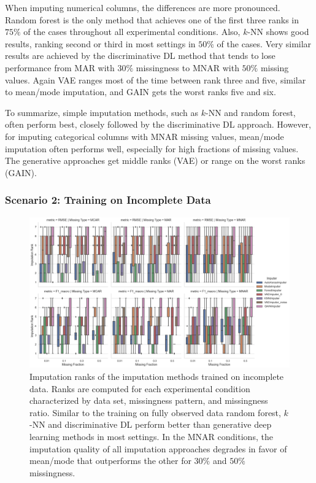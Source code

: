 \documentclass[utf8]{frontiersSCNS} %
\begin{document}
When imputing numerical columns, the differences are more pronounced. Random forest is the only method that achieves one of the first three ranks in $75\%$ of the cases throughout all experimental conditions. Also, $k$-NN shows good results, ranking second or third in most settings in $50\%$ of the cases. Very similar results are achieved by the discriminative DL method that tends to lose performance from MAR with $30\%$ missingness to MNAR with $50\%$ missing values. Again VAE ranges most of the time between rank three and five, similar to mean/mode imputation, and GAIN gets the worst ranks five and six.

To summarize, simple imputation methods, such as $k$-NN and random forest, often perform best, closely followed by the discriminative DL approach. However, for imputing categorical columns with MNAR missing values, mean/mode imputation often performs well, especially for high fractions of missing values. The generative approaches get middle ranks (VAE) or range on the worst ranks (GAIN).

\subsubsection{Scenario 2: Training on Incomplete Data}


\begin{figure}\centering
	\includegraphics[width=1\columnwidth]{corrupted_impute_rank_boxplot}
	\caption{Imputation ranks of the  imputation methods trained on incomplete data. Ranks are computed for each experimental condition characterized by data set, missingness pattern, and missingness ratio. Similar to the training on fully observed data random forest, $k$-NN and discriminative DL perform better than generative deep learning methods in most settings. In the MNAR conditions, the imputation quality of all imputation approaches degrades in favor of mean/mode that outperforms the other for $30\%$ and $50\%$ missingness.}
	\label{fig:corrupted_impute_rank_boxplot}
\end{figure}
\end{document}
